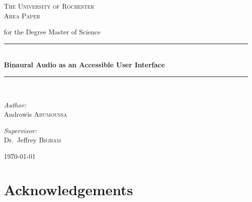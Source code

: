 \documentclass[12pt]{report}
\newcommand{\HRule}{\rule{\linewidth}{0.5mm}}
\begin{document}
\begin{titlepage}
\begin{center}

\textsc{\LARGE The University of Rochester}\\[1.0cm]

\textsc{\Large Area Paper}

for the Degree Master of Science\\[4cm]

\HRule \\[0.4cm]
{ \large \bfseries Binaural Audio as an Accessible User Interface }\\[0.4cm]

\HRule \\[0.5cm]

\begin{minipage}{0.4\textwidth}
\begin{flushleft} \large
\emph{Author:}\\
Androwis \textsc{Abumoussa}
\end{flushleft}
\end{minipage}
\begin{minipage}{0.4\textwidth}
\begin{flushright} \large
\emph{Supervisor:} \\
Dr.~Jeffrey \textsc{Bigham}
\end{flushright}
\end{minipage}

\vfill

{\large \today}

\end{center}
\end{titlepage}


\renewcommand{\thepage }{\roman{page}}
\tableofcontents

\newpage
\thispagestyle{empty}
\quad

\newpage
\chapter{Acknowledgements}
\end{document}

